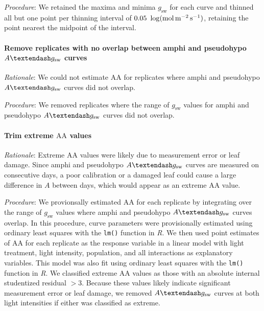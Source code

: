 \documentclass[
  letterpaper,
  DIV=11,
  numbers=noendperiod]{scrartcl}
\let\oldparagraph\paragraph
\renewcommand{\paragraph}[1]{\oldparagraph{#1}\mbox{}}
\newcommand{\aax}{$\mathrm{AA}$}
\newcommand{\agcurve}{$A \textendash g_\text{sw}$}
\newcommand{\gsw}{$g_\text{sw}$}
\begin{document}
\emph{Procedure}: We retained the maxima and minima \gsw{} for each
curve and thinned all but one point per thinning interval of
\(0.05~\log(\si{\mol\raiseto{-2}\meter\raiseto{-1}\second})\), retaining
the point nearest the midpoint of the interval.

\paragraph{\texorpdfstring{Remove replicates with no overlap between
amphi and pseudohypo \agcurve{}
curves}{Remove replicates with no overlap between amphi and pseudohypo  curves}}\label{remove-replicates-with-no-overlap-between-amphi-and-pseudohypo-curves}

\emph{Rationale}: We could not estimate \aax{} for replicates where
amphi and pseudohypo \agcurve{} curves did not overlap.

\emph{Procedure}: We removed replicates where the range of \gsw{} values
for amphi and pseudohypo \agcurve{} curves did not overlap.

\paragraph{\texorpdfstring{Trim extreme \aax{}
values}{Trim extreme  values}}\label{trim-extreme-values}

\emph{Rationale}: Extreme \aax{} values were likely due to measurement
error or leaf damage. Since amphi and pseudohypo \agcurve{} curves are
measured on consecutive days, a poor calibration or a damaged leaf could
cause a large difference in \(A\) between days, which would appear as an
extreme \aax{} value.

\emph{Procedure}: We provionsally estimated \aax{} for each replicate by
integrating over the range of \gsw{} values where amphi and pseudohypo
\agcurve{} curves overlap. In this procedure, curve parameters were
provisionally estimated using ordinary least squares with the
\texttt{lm()} function in \emph{R}. We then used point estimates of
\aax{} for each replicate as the response variable in a linear model
with light treatment, light intensity, population, and all interactions
as explanatory variables. This model was also fit using ordinary least
squares with the \texttt{lm()} function in \emph{R}. We classified
extreme \aax{} values as those with an absolute internal studentized
residual \(> 3\). Because these values likely indicate significant
measurement error or leaf damage, we removed \agcurve{} curves at both
light intensities if either was classified as extreme.
\end{document}
